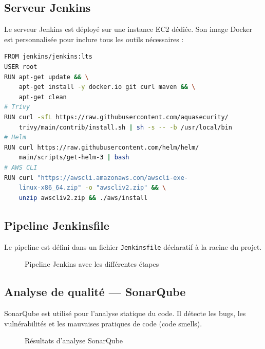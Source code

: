 \subsection{Serveur Jenkins}
Le serveur Jenkins est déployé sur une instance EC2 dédiée. Son image Docker est personnalisée pour inclure tous les outils nécessaires :

\begin{lstlisting}[language=bash, caption={Dockerfile Jenkins personnalisé}, label={lst:jenkins_dockerfile}]
FROM jenkins/jenkins:lts
USER root
RUN apt-get update && \
    apt-get install -y docker.io git curl maven && \
    apt-get clean
# Trivy
RUN curl -sfL https://raw.githubusercontent.com/aquasecurity/
    trivy/main/contrib/install.sh | sh -s -- -b /usr/local/bin
# Helm
RUN curl https://raw.githubusercontent.com/helm/helm/
    main/scripts/get-helm-3 | bash
# AWS CLI
RUN curl "https://awscli.amazonaws.com/awscli-exe-
    linux-x86_64.zip" -o "awscliv2.zip" && \
    unzip awscliv2.zip && ./aws/install
\end{lstlisting}

\subsection{Pipeline Jenkinsfile}
Le pipeline est défini dans un fichier \texttt{Jenkinsfile} déclaratif à la racine du projet.

\begin{figure}[H]
    \centering
    \caption{Pipeline Jenkins avec les différentes étapes}
    \label{fig:jenkins_pipeline}
\end{figure}

\subsection{Analyse de qualité --- SonarQube}
SonarQube est utilisé pour l'analyse statique du code. Il détecte les bugs, les vulnérabilités et les mauvaises pratiques de code (code smells).

\begin{figure}[H]
    \centering
    \caption{Résultats d'analyse SonarQube}
    \label{fig:sonarqube}
\end{figure}

